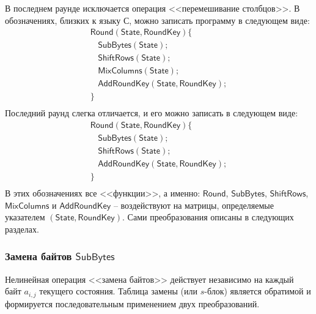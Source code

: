 В последнем раунде исключается операция <<перемешивание столбцов>>. В обозначениях, близких к языку С, можно записать программу в следующем виде:
\[
    \begin{array}{l}
        \mathsf{Round(State, RoundKey)} \{ \\
        ~~~~ \mathsf{SubBytes(State)}; \\
        ~~~~ \mathsf{ShiftRows(State)}; \\
        ~~~~ \mathsf{MixColumns(State)}; \\
        ~~~~ \mathsf{AddRoundKey(State, RoundKey)}; \\
        \} \\
    \end{array}
\]
Последний раунд слегка отличается, и его можно записать в следующем виде:
\[
    \begin{array}{l}
        \mathsf{Round(State, RoundKey)} \{ \\
        ~~~~ \mathsf{SubBytes(State)}; \\
        ~~~~ \mathsf{ShiftRows(State)}; \\
        ~~~~ \mathsf{AddRoundKey(State, RoundKey)}; \\
        \} \\
    \end{array}
\]
В этих обозначениях все <<функции>>, а именно: $\mathsf{Round}$, $\mathsf{SubBytes}$, $\mathsf{ShiftRows}$, $\mathsf{MixColumns}$ и $\mathsf{AddRoundKey}$ -- воздействуют на матрицы, определяемые указателем $\mathsf{(State, RoundKey)}$. Сами преобразования описаны в следующих разделах.


\subsubsection{Замена байтов $\mathsf{SubBytes}$}

Нелинейная операция <<замена байтов>> действует независимо на каждый байт $a_{i,j}$ текущего состояния. Таблица замены (или $s$-блок) является обратимой и формируется последовательным применением двух преобразований.

